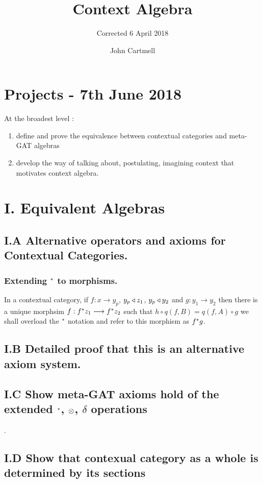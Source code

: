 \documentclass[10pt,a4paper]{scrartcl}
\title{Context Algebra}
\subtitle{Corrected 6 April 2018}
\author{John Cartmell}
\begin{document}
\maketitle


\section{Projects - 7th June 2018 }
At the broadest level :
\begin{enumerate}[I]
	\item define and prove the equivalence between contextual categories and meta-GAT algebras
	\item develop the way of talking about, postulating, imagining context that motivates context algebra. 
\end{enumerate}
\section{I. Equivalent Algebras}
\subsection{I.A Alternative operators and axioms for Contextual Categories.}
\subsubsection{Extending $^*$ to morphisms.}
In a contextual category, if $f: x \longrightarrow y_p$, $y_p \triangleleft z_1$,
$y_p \triangleleft y_2$ and $g: y_1 \longrightarrow y_2$ then 
there is a unique morphsim $f: f ^* z_1 \longrightarrow f ^* z_2$ such that 
$h \circ q(f,B) = q(f,A) \circ g$ we shall overload the $^*$ notation and refer to this morphism as $f^* g$. 

\subsection{I.B Detailed proof that this is an alternative axiom system.}

\subsection{I.C Show meta-GAT axioms hold of the extended $^*$, $\otimes$, $\delta$
operations}.
\subsection {I.D Show that contexual category as a whole is determined by its sections}
\end{document}
